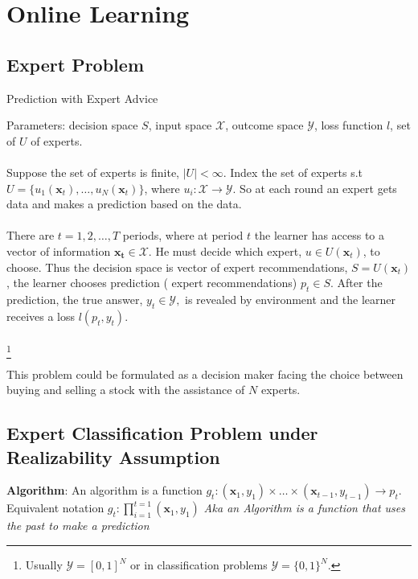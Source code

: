 \documentclass[11pt]{article}
\theoremstyle{quest}
\begin{document}
\section{Online Learning}

\subsection{Expert Problem}
\begin{tcolorbox}

\begin{center}Prediction with Expert Advice\end{center}
Parameters: decision space $S$, input space $\mathcal{X}$, outcome space $\mathcal{Y}$, loss function $l$, set of $U$ of experts.\\ \\ 
Suppose the set of experts is finite, $|U| <\infty$. Index the set of experts s.t $U= \{u_1(\mathbf{x}_t),\dots, u_N(\mathbf{x}_t) \}$, where $u_i: \mathcal{X} \rightarrow \mathcal{Y}$. So at each round an expert gets data and makes a prediction based on the data.\\ \\ 
There are $t = 1,2,\dots,T$ periods, where at period $t$ the learner has access to a vector of information $\mathbf{x_t}\in \mathcal{X}$. He must decide which expert, $u\in U(\mathbf{x}_t)$, to choose. Thus the decision space is vector of expert recommendations, $S =U(\mathbf{x}_t)$, the learner chooses prediction ( expert recommendations) $p_t\in S$. After the prediction, the true answer, $y_t \in \mathcal{Y},$ is revealed by environment and the learner receives a loss $l(p_t, y_t)$. \\ \\ 
\footnote{Usually $\mathcal{Y}=[0,1]^N$ or in classification problems $\mathcal{Y}=\{0,1\}^N$. }
\end{tcolorbox}

This problem could be formulated as a decision maker facing the choice between buying and selling a stock with the assistance of $N$ experts. 
\subsection{Expert Classification Problem under Realizability Assumption}
\begin{tcolorbox}
\textbf{Algorithm}: An algorithm is a function $g_t: (\mathbf{x}_1,y_1)\times \dots \times (\mathbf{x}_{t-1},y_{t-1})\rightarrow p_t.$ Equivalent notation $g_t: \prod_{i=1}^{t=1}(\mathbf{x}_1,y_1)$ \textit{Aka an Algorithm is a function that uses the past to make a prediction}
\end{tcolorbox}
\end{document}
